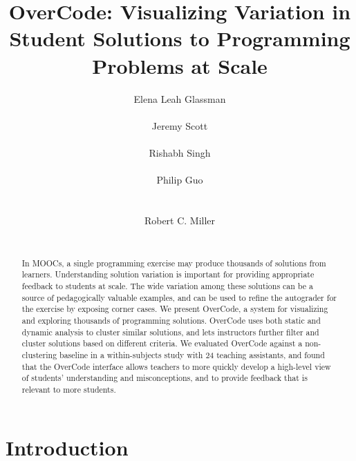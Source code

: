 \documentclass{sigchi}
\begin{document}
\title{OverCode: Visualizing Variation in Student Solutions to Programming Problems at Scale}

\author{
  \alignauthor Elena Leah Glassman\\
    \\
  \alignauthor Jeremy Scott\\
    \\
  \alignauthor Rishabh Singh\\
    \\
      \alignauthor Philip Guo\\
      \\
      \\
            \alignauthor Robert C. Miller\\
      \\
}


\maketitle

\begin{abstract}
In MOOCs, a single programming exercise may produce thousands of solutions from learners. Understanding solution variation is important for providing appropriate feedback to students at scale.  The wide variation among these solutions can be a source of pedagogically valuable examples, and can be used to refine the autograder for the exercise by exposing corner cases. 
We present OverCode, a system for visualizing and exploring thousands of programming solutions. OverCode uses both static and dynamic analysis to cluster similar solutions, and lets instructors further filter and cluster solutions based on different criteria.
We evaluated OverCode against a non-clustering baseline in a within-subjects study with 24 teaching assistants, and found that the OverCode interface allows teachers to more quickly develop a high-level view of students' understanding and misconceptions, and to provide feedback that is relevant to more students.
\end{abstract}


\section{Introduction}
\end{document}

